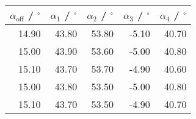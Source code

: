 \begin{tabular}{r|rrrr}\\
 $\alpha_\text{off}$ / ${}^\circ$ & $\alpha_1$ / ${}^\circ$ & $\alpha_2$ / ${}^\circ$ & $\alpha_3$ / ${}^\circ$ & $\alpha_4$ / ${}^\circ$  \\
 \hline
14.90 & 43.80 & 53.80 & -5.10 & 40.70\\
15.00 & 43.90 & 53.60 & -5.00 & 40.80\\
15.10 & 43.70 & 53.70 & -4.90 & 40.60\\
15.00 & 43.80 & 53.50 & -5.00 & 40.80\\
15.10 & 43.70 & 53.50 & -4.90 & 40.70
\end{tabular}